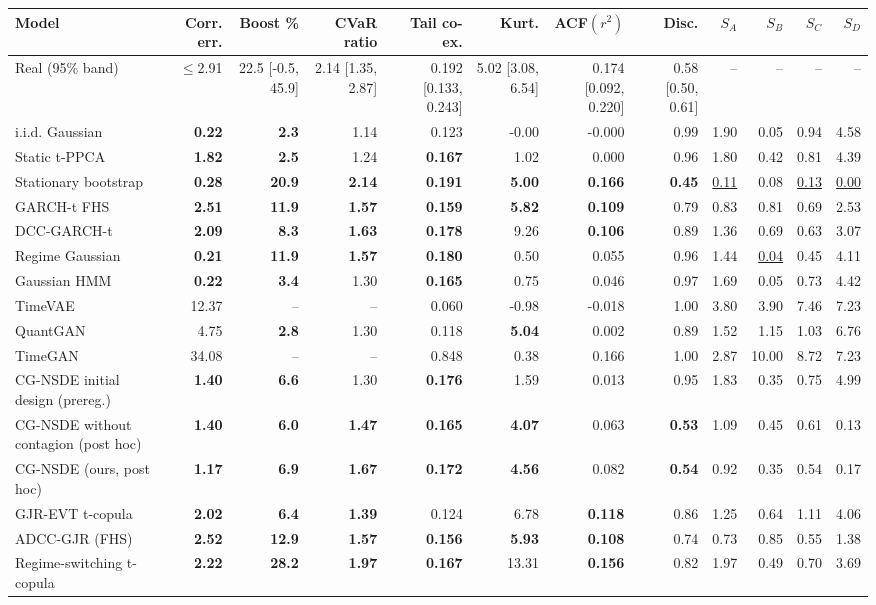\begin{tabular}{lrrrrrrrrrrr}
\toprule
Model & Corr. err. & Boost \% & CVaR ratio & Tail co-ex. & Kurt. & ACF$(r^2)$ & Disc. & $S_A$ & $S_B$ & $S_C$ & $S_D$ \\
\midrule
Real (95\% band) & $\le$2.91 & 22.5 [-0.5, 45.9] & 2.14 [1.35, 2.87] & 0.192 [0.133, 0.243] & 5.02 [3.08, 6.54] & 0.174 [0.092, 0.220] & 0.58 [0.50, 0.61] & -- & -- & -- & -- \\
\midrule
i.i.d. Gaussian & \textbf{0.22} & \textbf{2.3} & 1.14 & 0.123 & -0.00 & -0.000 & 0.99 & 1.90 & 0.05 & 0.94 & 4.58 \\
Static t-PPCA & \textbf{1.82} & \textbf{2.5} & 1.24 & \textbf{0.167} & 1.02 & 0.000 & 0.96 & 1.80 & 0.42 & 0.81 & 4.39 \\
Stationary bootstrap & \textbf{0.28} & \textbf{20.9} & \textbf{2.14} & \textbf{0.191} & \textbf{5.00} & \textbf{0.166} & \textbf{0.45} & \underline{0.11} & 0.08 & \underline{0.13} & \underline{0.00} \\
GARCH-t FHS & \textbf{2.51} & \textbf{11.9} & \textbf{1.57} & \textbf{0.159} & \textbf{5.82} & \textbf{0.109} & 0.79 & 0.83 & 0.81 & 0.69 & 2.53 \\
DCC-GARCH-t & \textbf{2.09} & \textbf{8.3} & \textbf{1.63} & \textbf{0.178} & 9.26 & \textbf{0.106} & 0.89 & 1.36 & 0.69 & 0.63 & 3.07 \\
Regime Gaussian & \textbf{0.21} & \textbf{11.9} & \textbf{1.57} & \textbf{0.180} & 0.50 & 0.055 & 0.96 & 1.44 & \underline{0.04} & 0.45 & 4.11 \\
Gaussian HMM & \textbf{0.22} & \textbf{3.4} & 1.30 & \textbf{0.165} & 0.75 & 0.046 & 0.97 & 1.69 & 0.05 & 0.73 & 4.42 \\
TimeVAE & 12.37 & -- & -- & 0.060 & -0.98 & -0.018 & 1.00 & 3.80 & 3.90 & 7.46 & 7.23 \\
QuantGAN & 4.75 & \textbf{2.8} & 1.30 & 0.118 & \textbf{5.04} & 0.002 & 0.89 & 1.52 & 1.15 & 1.03 & 6.76 \\
TimeGAN & 34.08 & -- & -- & 0.848 & 0.38 & 0.166 & 1.00 & 2.87 & 10.00 & 8.72 & 7.23 \\
CG-NSDE initial design (prereg.) & \textbf{1.40} & \textbf{6.6} & 1.30 & \textbf{0.176} & 1.59 & 0.013 & 0.95 & 1.83 & 0.35 & 0.75 & 4.99 \\
CG-NSDE without contagion (post hoc) & \textbf{1.40} & \textbf{6.0} & \textbf{1.47} & \textbf{0.165} & \textbf{4.07} & 0.063 & \textbf{0.53} & 1.09 & 0.45 & 0.61 & 0.13 \\
CG-NSDE (ours, post hoc) & \textbf{1.17} & \textbf{6.9} & \textbf{1.67} & \textbf{0.172} & \textbf{4.56} & 0.082 & \textbf{0.54} & 0.92 & 0.35 & 0.54 & 0.17 \\
GJR-EVT t-copula & \textbf{2.02} & \textbf{6.4} & \textbf{1.39} & 0.124 & 6.78 & \textbf{0.118} & 0.86 & 1.25 & 0.64 & 1.11 & 4.06 \\
ADCC-GJR (FHS) & \textbf{2.52} & \textbf{12.9} & \textbf{1.57} & \textbf{0.156} & \textbf{5.93} & \textbf{0.108} & 0.74 & 0.73 & 0.85 & 0.55 & 1.38 \\
Regime-switching t-copula & \textbf{2.22} & \textbf{28.2} & \textbf{1.97} & \textbf{0.167} & 13.31 & \textbf{0.156} & 0.82 & 1.97 & 0.49 & 0.70 & 3.69 \\
\bottomrule
\end{tabular}
